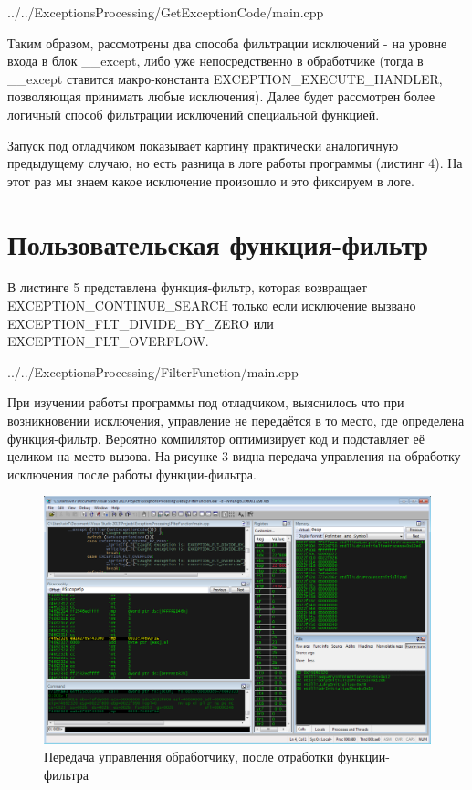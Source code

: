 \documentclass[a4paper, 12pt]{report}		%
\begin{document}

{../../ExceptionsProcessing/GetExceptionCode/main.cpp}

Таким образом, рассмотрены два способа фильтрации исключений - на уровне входа в блок \_\_except, либо уже непосредственно в обработчике (тогда в \_\_except ставится макро-константа EXCEPTION\_EXECUTE\_HANDLER, позволяющая принимать любые исключения). Далее будет рассмотрен более логичный способ фильтрации исключений специальной функцией.

Запуск под отладчиком показывает картину практически аналогичную предыдущему случаю, но есть разница в логе работы программы (листинг 4). На этот раз мы знаем какое исключение произошло и это фиксируем в логе.




\chapter*{Пользовательская функция-фильтр}

В листинге 5 представлена функция-фильтр, которая возвращает \\ EXCEPTION\_CONTINUE\_SEARCH только если исключение вызвано \\ EXCEPTION\_FLT\_DIVIDE\_BY\_ZERO или EXCEPTION\_FLT\_OVERFLOW.


{../../ExceptionsProcessing/FilterFunction/main.cpp}

При изучении работы программы под отладчиком, выяснилось что при возникновении исключения, управление не передаётся в то место, где определена функция-фильтр. Вероятно компилятор оптимизирует код и подставляет её целиком на место вызова. На рисунке 3 видна передача управления на обработку исключения после работы функции-фильтра.

\begin{figure}[h!]
\centering
\includegraphics[scale=0.5]{res/003}
\caption{Передача управления обработчику, после отработки функции-фильтра}
\end{figure}
\end{document}
